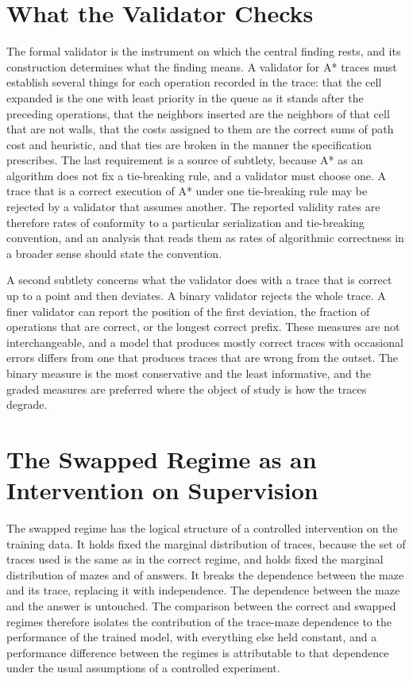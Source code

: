 \section{What the Validator Checks}

The formal validator is the instrument on which the central finding rests, and its construction determines what the finding means. A validator for A* traces must establish several things for each operation recorded in the trace: that the cell expanded is the one with least priority in the queue as it stands after the preceding operations, that the neighbors inserted are the neighbors of that cell that are not walls, that the costs assigned to them are the correct sums of path cost and heuristic, and that ties are broken in the manner the specification prescribes. The last requirement is a source of subtlety, because A* as an algorithm does not fix a tie-breaking rule, and a validator must choose one. A trace that is a correct execution of A* under one tie-breaking rule may be rejected by a validator that assumes another. The reported validity rates are therefore rates of conformity to a particular serialization and tie-breaking convention, and an analysis that reads them as rates of algorithmic correctness in a broader sense should state the convention.

A second subtlety concerns what the validator does with a trace that is correct up to a point and then deviates. A binary validator rejects the whole trace. A finer validator can report the position of the first deviation, the fraction of operations that are correct, or the longest correct prefix. These measures are not interchangeable, and a model that produces mostly correct traces with occasional errors differs from one that produces traces that are wrong from the outset. The binary measure is the most conservative and the least informative, and the graded measures are preferred where the object of study is how the traces degrade.

\section{The Swapped Regime as an Intervention on Supervision}

The swapped regime has the logical structure of a controlled intervention on the training data. It holds fixed the marginal distribution of traces, because the set of traces used is the same as in the correct regime, and holds fixed the marginal distribution of mazes and of answers. It breaks the dependence between the maze and its trace, replacing it with independence. The dependence between the maze and the answer is untouched. The comparison between the correct and swapped regimes therefore isolates the contribution of the trace-maze dependence to the performance of the trained model, with everything else held constant, and a performance difference between the regimes is attributable to that dependence under the usual assumptions of a controlled experiment.

